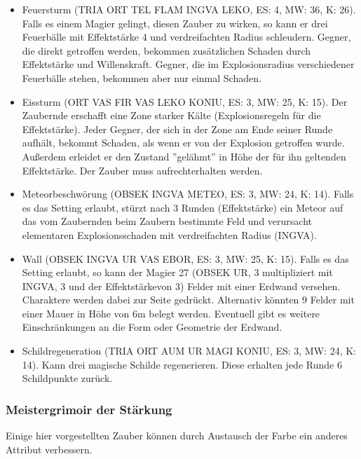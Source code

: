 \documentclass{article}
\begin{document}
\begin{itemize}
\item Feuersturm (TRIA ORT TEL FLAM INGVA LEKO, ES: 4, MW: 36, K: 26). Falls es einem Magier gelingt, diesen Zauber zu wirken, so kann er drei Feuerbälle mit Effektstärke 4 und verdreifachten Radius schleudern. Gegner, die direkt getroffen werden, bekommen zusätzlichen Schaden durch Effektstärke und Willenskraft. Gegner, die im Explosionsradius verschiedener Feuerbälle stehen, bekommen aber nur einmal Schaden.
\item Eissturm (ORT VAS FIR VAS LEKO KONIU, ES: 3, MW: 25, K: 15). Der Zaubernde erschafft eine Zone starker Kälte (Explosionsregeln für die Effektstärke). Jeder Gegner, der sich in der Zone am Ende seiner Runde aufhält, bekommt Schaden, als wenn er von der Explosion getroffen wurde. Außerdem erleidet er den Zustand ''gelähmt'' in Höhe der für ihn geltenden Effektstärke. Der Zauber muss aufrechterhalten werden. 
\item Meteorbeschwörung (OBSEK INGVA METEO, ES: 3, MW: 24, K: 14). Falls es das Setting erlaubt, stürzt nach 3 Runden (Effektstärke) ein Meteor auf das vom Zaubernden beim Zaubern bestimmte Feld und verursacht elementaren Explosionsschaden mit verdreifachten Radius (INGVA).
\item Wall (OBSEK INGVA UR VAS EBOR, ES: 3, MW: 25, K: 15). Falls es das Setting  erlaubt, so kann der Magier 27 (OBSEK UR, 3 multipliziert mit INGVA, 3 und der Effektstärkevon 3) Felder mit einer Erdwand versehen. Charaktere werden dabei zur Seite gedrückt. Alternativ könnten 9 Felder mit einer Mauer in Höhe von 6m belegt werden. Eventuell gibt es weitere Einschränkungen an die Form oder Geometrie der Erdwand.
\item Schildregeneration (TRIA ORT AUM UR MAGI KONIU, ES: 3, MW: 24, K: 14). Kann drei magische Schilde regenerieren. Diese erhalten jede Runde 6 Schildpunkte zurück.
\end{itemize}

\subsubsection{Meistergrimoir der Stärkung}

Einige hier vorgestellten Zauber können durch Austausch der Farbe ein anderes Attribut verbessern.
\end{document}
